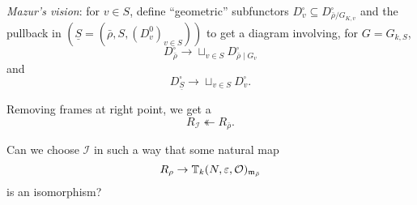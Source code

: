 \documentclass[reqno]{amsart} 
\begin{document}
\emph{Mazur's vision}: for $v \in S$, define ``geometric'' subfunctors $D_v^{\square} \subseteq D_{\bar{\rho} / G_{K, v}}^{\square}$ and the pullback in $(\underline{S} =(\bar{\rho}, S,(D_v^0)_{v \in S}))$ to get a diagram involving, for $G = G_{k , S}$,
\begin{equation*}
  D_{\bar{\rho}}^{\square} \rightarrow \sqcup_{v \in S} D_{\bar{\rho} \mid G_v}^{\square}
\end{equation*}
and
\begin{equation*}
  D_{\underline{S}}^{\square} \rightarrow \sqcup_{v \in S} D_v^{\square}.
\end{equation*}

Removing frames at right point, we get a
\begin{equation*}
  R_{\mathcal{I}} \twoheadleftarrow R_{\bar{\rho}}.
\end{equation*}

\begin{question}\label{question:cq6thpc16r}
  Can we choose $\mathcal{I}$ in such a way that some natural map
  \begin{equation*}
    R_{\rho} \rightarrow \mathbb{T}_k(N, \varepsilon, \mathcal{O})_{\mathfrak{m}_{\bar{\rho}}}
  \end{equation*}
  is an isomorphism?
\end{question}
\end{document}

